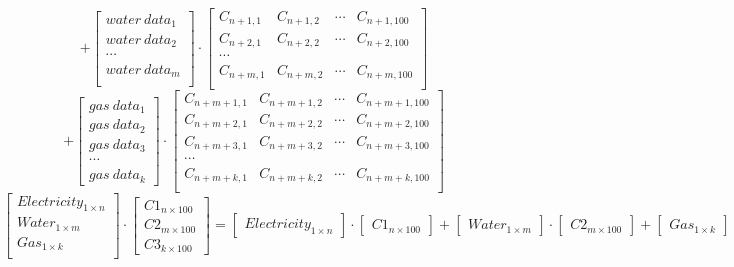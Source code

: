 \documentclass[a4paper]{article}
\begin{document}
\begin{equation*}
+\begin{bmatrix}
water\ data_1\\
water\ data_2\\
\cdots \\
water\ data_m\\
\end{bmatrix}\cdot
\begin{bmatrix}
C_{n+1,1}&C_{n+1,2} &\cdots &C_{n+1,100}\\
C_{n+2,1}&C_{n+2,2} &\cdots &C_{n+2,100}\\
\cdots\\
C_{n+m,1}&C_{n+m,2} &\cdots &C_{n+m,100}\\
\end{bmatrix}
\end{equation*}
\begin{equation*}
+\begin{bmatrix}
gas\ data_1\\
gas\ data_2\\
gas\ data_3\\
\cdots \\
gas\ data_k
\end{bmatrix}\cdot
\begin{bmatrix}
C_{n+m+1,1}&C_{n+m+1,2} &\cdots &C_{n+m+1,100}\\
C_{n+m+2,1}&C_{n+m+2,2} &\cdots &C_{n+m+2,100}\\
C_{n+m+3,1}&C_{n+m+3,2} &\cdots &C_{n+m+3,100}\\
\cdots\\
C_{n+m+k,1}&C_{n+m+k,2} &\cdots &C_{n+m+k,100}\\
\end{bmatrix}
\end{equation*}
\pagebreak
\begin{equation*}
\begin{bmatrix}
Electricity_{1\times n}\\
Water_{1\times m}\\
Gas_{1\times k}\\
\end{bmatrix}\cdot
\begin{bmatrix}
C1_{n\times 100}\\
C2_{m\times 100}\\
C3_{k\times 100}
\end{bmatrix} =
\begin{bmatrix}
Electricity_{1 \times n}
\end{bmatrix}\cdot
\begin{bmatrix}
C1_{n \times 100}
\end{bmatrix}+
\begin{bmatrix}
Water_{1 \times m}
\end{bmatrix}\cdot
\begin{bmatrix}
C2_{m \times 100}
\end{bmatrix}+
\begin{bmatrix}
Gas_{1 \times k}
\end{bmatrix}\cdot
\begin{bmatrix}
C3_{k \times 100}
\end{bmatrix}
\end{equation*}
\end{document}

